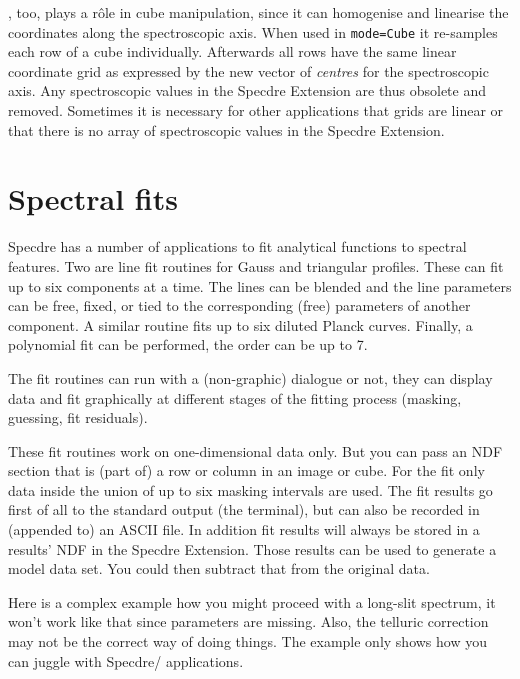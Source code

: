 {\tt{}},
   too, plays a r\^ole in cube manipulation, since it can homogenise and
   linearise the coordinates along the spectroscopic axis.  When used in
   {\tt mode=Cube} it re-samples each row of a cube individually.
   Afterwards all rows have the same linear coordinate grid as expressed
   by the new vector of {\it centres} for the spectroscopic axis.  Any
   spectroscopic values in the Specdre Extension are thus obsolete and
   removed.  Sometimes it is necessary for other applications that grids
   are linear or that there is no array of spectroscopic values in the
   Specdre Extension.


\section{\label{specfit}Spectral fits}

   Specdre has a number of applications to fit analytical functions to
   spectral features. Two are line fit routines for Gauss and triangular
   profiles. These can fit up to six components at a time. The lines can
   be blended and the line parameters can be free, fixed, or tied to the
   corresponding (free) parameters of another component. A similar
   routine fits up to six diluted Planck curves.  Finally, a polynomial
   fit can be performed, the order can be up to 7.

   The fit routines can run with a (non-graphic) dialogue or not, they
   can display data and fit graphically at different stages of the
   fitting process (masking, guessing, fit residuals).

   These fit routines work on one-dimensional data only. But you can
   pass an NDF section that is (part of) a row or column in an image or
   cube. For the fit only data inside the union of up to six masking
   intervals are used. The fit results go first of all to the standard
   output (the terminal), but can also be recorded in (appended to) an
   ASCII file. In addition fit results will always be stored in a
   results' NDF in the Specdre Extension. Those results can be used to
   generate a model data set. You could then subtract that from the
   original data.

   Here is a complex example how you might proceed with a long-slit
   spectrum, it won't work like that since parameters are missing. Also,
   the telluric correction may not be the correct way of doing
   things. The example only shows how you can juggle with
Specdre/
   applications.

